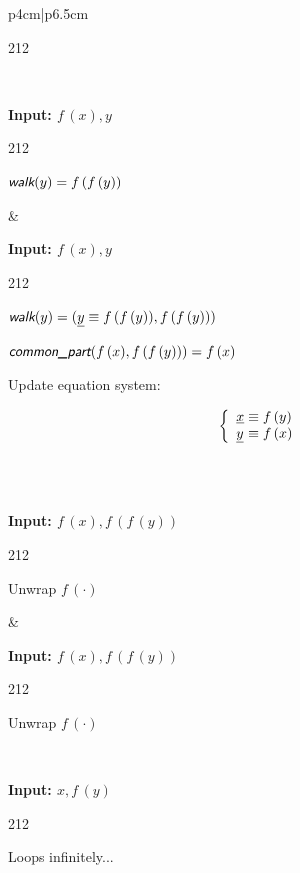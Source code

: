\begin{center}
\begin{longtable}{p{4cm}|p{6.5cm}}
{\begin{dinglist}{212}
            \end{dinglist}
        } \\\hline
        {
            \textbf{Input: $f\,(x), y$}
            \begin{dinglist}{212}
                \item $\walk(y) = f\,(f\,(y))$
            \end{dinglist}
        } & {
            \textbf{Input: $f\,(x), y$}
            \begin{dinglist}{212}
                \item $\walk(y) = (\underline{y} \equiv f\,(f\,(y)), f\,(f\,(y)))$
                \item $\commonpart(f\,(x), f\,(f\,(y))) = f\,(x)$
                \item Update equation system: \newline
                \begin{minipage}{\linewidth}
                    \begin{equation*}
                        \left\{\begin{array}{l@{{}\equiv{}}l}
                            \underline{x} & f\,(y) \\
                            \underline{y} & f\,(x) \\
                        \end{array}\right.
                    \end{equation*}
                \end{minipage}
            \end{dinglist}
        } \\\\\hline
        {
            \textbf{Input: $f\,(x), f\,(f\,(y))$}
            \begin{dinglist}{212}
                \item Unwrap $f\,(\cdot)$
            \end{dinglist}
        } & {
            \textbf{Input: $f\,(x), f\,(f\,(y))$}
            \begin{dinglist}{212}
                \item Unwrap $f\,(\cdot)$
            \end{dinglist}
        } \\\hline
        {
            \textbf{Input: $x, f\,(y)$}
            \begin{dinglist}{212}
                \item Loops infinitely...
            \end{dinglist}
}
\end{longtable}
\end{center}
